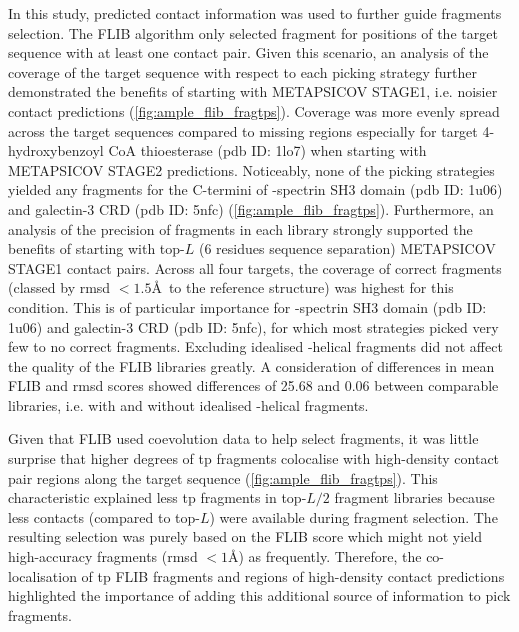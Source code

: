 In this study, predicted contact information was used to further guide fragments selection. The FLIB algorithm only selected fragment for positions of the target sequence with at least one contact pair. Given this scenario, an analysis of the coverage of the target sequence with respect to each picking strategy further demonstrated the benefits of starting with METAPSICOV STAGE1, i.e. noisier contact predictions (\cref{fig:ample_flib_fragtps}). Coverage was more evenly spread across the target sequences compared to missing regions especially for target 4-hydroxybenzoyl CoA thioesterase (\gls{pdb} ID: 1lo7) when starting with METAPSICOV STAGE2 predictions. Noticeably, none of the picking strategies yielded any fragments for the C-termini of \textalpha-spectrin SH3 domain (\gls{pdb} ID: 1u06) and galectin-3 CRD (\gls{pdb} ID: 5nfc) (\cref{fig:ample_flib_fragtps}). Furthermore, an analysis of the precision of fragments in each library strongly supported the benefits of starting with top-$L$ (6 residues sequence separation) METAPSICOV STAGE1 contact pairs. Across all four targets, the coverage of correct fragments (classed by \gls{rmsd} $<1.5$\AA\ to the reference structure) was highest for this condition. This is of particular importance for \textalpha-spectrin SH3 domain (\gls{pdb} ID: 1u06) and galectin-3 CRD (\gls{pdb} ID: 5nfc), for which most strategies picked very few to no correct fragments. Excluding idealised \textalpha-helical fragments did not affect the quality of the FLIB libraries greatly. A consideration of differences in mean FLIB and \gls{rmsd} scores showed differences of 25.68 and 0.06 between comparable libraries, i.e. with and without idealised \textalpha-helical fragments.

Given that FLIB used coevolution data to help select fragments, it was little surprise that higher degrees of \gls{tp} fragments colocalise with high-density contact pair regions along the target sequence (\cref{fig:ample_flib_fragtps}). This characteristic explained less \gls{tp} fragments in top-$L/2$ fragment libraries because less contacts (compared to top-$L$) were available during fragment selection. The resulting selection was purely based on the FLIB score which might not yield high-accuracy fragments (\gls{rmsd} $<1$\AA) as frequently. Therefore, the co-localisation of \gls{tp} FLIB fragments and regions of high-density contact predictions highlighted the importance of adding this additional source of information to pick fragments. 

